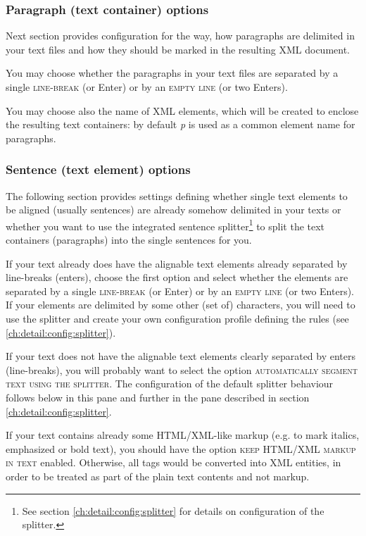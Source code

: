\documentclass[a4paper,10pt,oneside]{book}
\newcommand{\menu}[1]{\textsc{#1}}
\begin{document}
\subsubsection{Paragraph (text container) options}

Next section provides configuration for the way, how paragraphs are delimited in your text files and how they should be marked in the resulting XML document.

You may choose whether the paragraphs in your text files are separated by a single \menu{line-break} (or Enter) or by an \menu{empty line} (or two Enters).

You may choose also the name of XML elements, which will be created to enclose the resulting text containers: by default \emph{p} is used as a common element name for paragraphs.

\subsubsection{Sentence (text element) options}

The following section provides settings defining whether single text elements to be aligned (usually sentences) are already somehow delimited in your texts or whether you want to use the integrated sentence splitter\footnote{See section \ref{ch:detail:config:splitter} for details on configuration of the splitter.} to split the text containers (paragraphs) into the single sentences for you.

If your text already does have the alignable text elements already separated by line-breaks (enters), choose the first option and select whether the elements are separated by a single \menu{line-break} (or Enter) or by an \menu{empty line} (or two Enters). If your elements are delimited by some other (set of) characters, you will need to use the splitter and create your own configuration profile defining the rules (see \ref{ch:detail:config:splitter}).

If your text does not have the alignable text elements clearly separated by enters (line-breaks), you will probably want to select the option \menu{automatically segment text using the splitter}. The configuration of the default splitter behaviour follows below in this pane and further in the pane described in section \ref{ch:detail:config:splitter}.

If your text contains already some HTML/XML-like markup (e.g. to mark italics, emphasized or bold text), you should have the option \menu{keep HTML/XML markup in text} enabled. Otherwise, all tags would be converted into XML entities, in order to be treated as part of the plain text contents and not markup.
\end{document}
